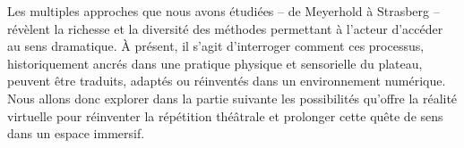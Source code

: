 \vspace{\baselineskip}

Les multiples approches que nous avons étudiées – de Meyerhold à Strasberg – révèlent la richesse et la diversité des méthodes permettant 
à l’acteur d’accéder au sens dramatique. À présent, il s’agit d’interroger comment ces processus, historiquement ancrés dans une pratique
physique et sensorielle du plateau, peuvent être traduits, adaptés ou réinventés dans un environnement numérique. Nous allons donc explorer 
dans la partie suivante les possibilités qu’offre la réalité virtuelle pour réinventer la répétition théâtrale et prolonger cette quête de 
sens dans un espace immersif.

  




